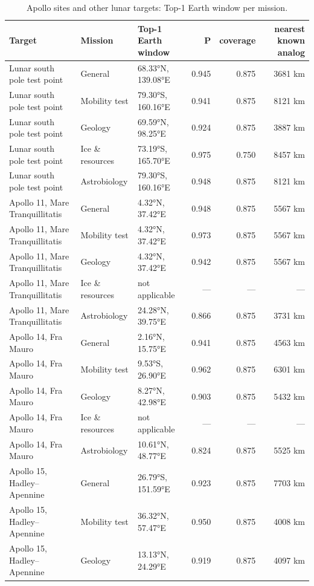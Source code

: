 \begin{table}[ht]
\centering\small
\caption{Apollo sites and other lunar targets: Top-1 Earth window per mission.}
\label{tab:moon}
\begin{tabular}{lllrrr}
\hline
Target & Mission & Top-1 Earth window & P & coverage & nearest known analog \\
\hline
Lunar south pole test point & General & 68.33°N, 139.08°E & 0.945 & 0.875 & 3681 km \\
Lunar south pole test point & Mobility test & 79.30°S, 160.16°E & 0.941 & 0.875 & 8121 km \\
Lunar south pole test point & Geology & 69.59°N, 98.25°E & 0.924 & 0.875 & 3887 km \\
Lunar south pole test point & Ice \& resources & 73.19°S, 165.70°E & 0.975 & 0.750 & 8457 km \\
Lunar south pole test point & Astrobiology & 79.30°S, 160.16°E & 0.948 & 0.875 & 8121 km \\
Apollo 11, Mare Tranquillitatis & General & 4.32°N, 37.42°E & 0.948 & 0.875 & 5567 km \\
Apollo 11, Mare Tranquillitatis & Mobility test & 4.32°N, 37.42°E & 0.973 & 0.875 & 5567 km \\
Apollo 11, Mare Tranquillitatis & Geology & 4.32°N, 37.42°E & 0.942 & 0.875 & 5567 km \\
Apollo 11, Mare Tranquillitatis & Ice \& resources & not applicable & — & — & — \\
Apollo 11, Mare Tranquillitatis & Astrobiology & 24.28°N, 39.75°E & 0.866 & 0.875 & 3731 km \\
Apollo 14, Fra Mauro & General & 2.16°N, 15.75°E & 0.941 & 0.875 & 4563 km \\
Apollo 14, Fra Mauro & Mobility test & 9.53°S, 26.90°E & 0.962 & 0.875 & 6301 km \\
Apollo 14, Fra Mauro & Geology & 8.27°N, 42.98°E & 0.903 & 0.875 & 5432 km \\
Apollo 14, Fra Mauro & Ice \& resources & not applicable & — & — & — \\
Apollo 14, Fra Mauro & Astrobiology & 10.61°N, 48.77°E & 0.824 & 0.875 & 5525 km \\
Apollo 15, Hadley–Apennine & General & 26.79°S, 151.59°E & 0.923 & 0.875 & 7703 km \\
Apollo 15, Hadley–Apennine & Mobility test & 36.32°N, 57.47°E & 0.950 & 0.875 & 4008 km \\
Apollo 15, Hadley–Apennine & Geology & 13.13°N, 24.29°E & 0.919 & 0.875 & 4097 km \\

\end{tabular}
\end{table}
